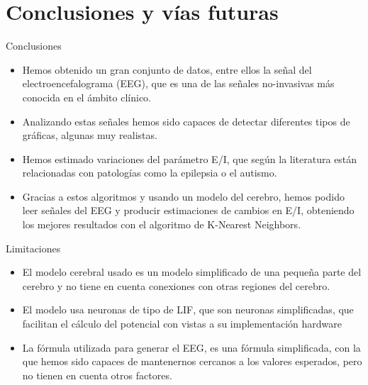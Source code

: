 \documentclass{beamer}
\begin{document}
\section{Conclusiones y vías futuras}

\begin{frame}{Conclusiones}

    \begin{itemize}
    \justifying
      \item Hemos obtenido un gran conjunto de datos, entre ellos la señal del electroencefalograma (EEG), que es una de las señales no-invasivas más conocida en el ámbito clínico.
      \vspace{2mm}
      \pause
      \item Analizando estas señales hemos sido capaces de detectar diferentes tipos de gráficas, algunas muy realistas.
      \vspace{2mm}
      \pause
      \item Hemos estimado variaciones del parámetro E/I, que según la literatura están relacionadas con patologías como la epilepsia o el autismo.
      \vspace{2mm}
      \pause
      \item Gracias a estos algoritmos y usando un modelo del cerebro, hemos podido leer señales del EEG y producir estimaciones de cambios en E/I, obteniendo los mejores resultados con el algoritmo de K-Nearest Neighbors.
    \end{itemize}
\end{frame}

\begin{frame}{Limitaciones}

\begin{itemize}
    \justifying
    \item El modelo cerebral usado es un modelo simplificado de una pequeña parte del cerebro y no tiene en cuenta conexiones con otras regiones del cerebro.
    \vspace{4mm}    
    \pause
    \item El modelo usa neuronas de tipo de LIF, que son neuronas simplificadas, que facilitan el cálculo del potencial con vistas a su implementación hardware
    \vspace{4mm}
    \pause
    \item La fórmula utilizada para generar el EEG, es una fórmula simplificada, con la que hemos sido capaces de mantenernos cercanos a los valores esperados, pero no tienen en cuenta otros factores.
    
\end{itemize}
\end{frame}
\end{document}
